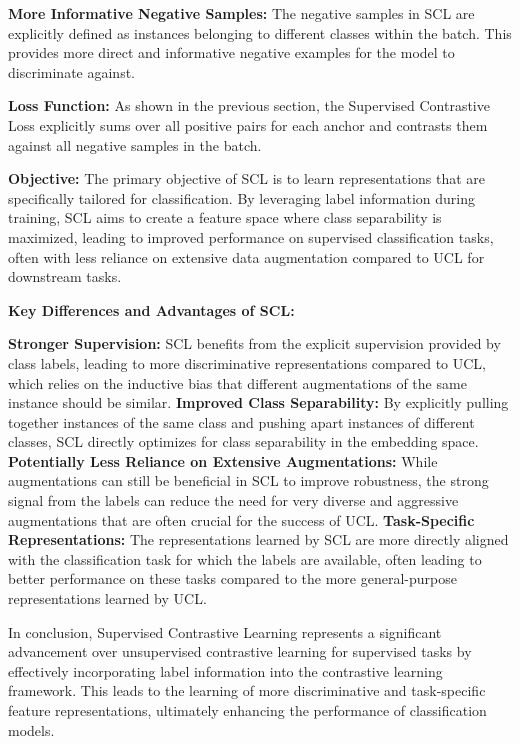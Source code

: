 \textbf{More Informative Negative Samples:} The negative samples in SCL are explicitly defined as instances belonging to different classes within the batch. This provides more direct and informative negative examples for the model to discriminate against.

\textbf{Loss Function:} As shown in the previous section, the Supervised Contrastive Loss explicitly sums over all positive pairs for each anchor and contrasts them against all negative samples in the batch.

\textbf{Objective:} The primary objective of SCL is to learn representations that are specifically tailored for classification. By leveraging label information during training, SCL aims to create a feature space where class separability is maximized, leading to improved performance on supervised classification tasks, often with less reliance on extensive data augmentation compared to UCL for downstream tasks.

\textbf{Key Differences and Advantages of SCL:}

\textbf{Stronger Supervision:} SCL benefits from the explicit supervision provided by class labels, leading to more discriminative representations compared to UCL, which relies on the inductive bias that different augmentations of the same instance should be similar.
\textbf{Improved Class Separability:} By explicitly pulling together instances of the same class and pushing apart instances of different classes, SCL directly optimizes for class separability in the embedding space.
\textbf{Potentially Less Reliance on Extensive Augmentations:} While augmentations can still be beneficial in SCL to improve robustness, the strong signal from the labels can reduce the need for very diverse and aggressive augmentations that are often crucial for the success of UCL.
\textbf{Task-Specific Representations:} The representations learned by SCL are more directly aligned with the classification task for which the labels are available, often leading to better performance on these tasks compared to the more general-purpose representations learned by UCL.

In conclusion, Supervised Contrastive Learning represents a significant advancement over unsupervised contrastive learning for supervised tasks by effectively incorporating label information into the contrastive learning framework. This leads to the learning of more discriminative and task-specific feature representations, ultimately enhancing the performance of classification models.

